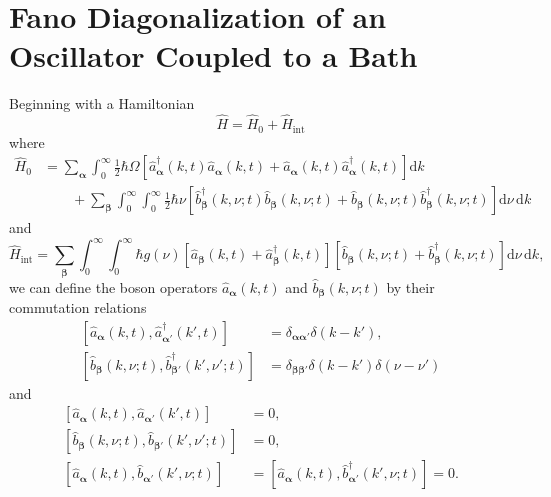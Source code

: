 
\section{Fano Diagonalization of an Oscillator Coupled to a Bath}\label{app:fanoDiagonalization}

Beginning with a Hamiltonian
\begin{equation}
\hat{H} = \hat{H}_0 + \hat{H}_\mathrm{int}
\end{equation}
where 
\begin{equation}
\begin{split}
\hat{H}_0 &= \sum_{\bm{\alpha}}\int_0^\infty\frac{1}{2}\hbar\Omega\left[\hat{a}_{\bm{\alpha}}^\dagger(k,t)\hat{a}_{\bm{\alpha}}(k,t) + \hat{a}_{\bm{\alpha}}(k,t)\hat{a}_{\bm{\alpha}}^\dagger(k,t)\right]\mathrm{d}k\\
&\qquad + \sum_{\bm{\beta}}\int_0^\infty\int_0^\infty\frac{1}{2}\hbar\nu\left[\hat{b}_{\bm{\beta}}^\dagger(k,\nu;t)\hat{b}_{\bm{\beta}}(k,\nu;t) + \hat{b}_{\bm{\beta}}(k,\nu;t)\hat{b}_{\bm{\beta}}^\dagger(k,\nu;t)\right]\mathrm{d}\nu\,\mathrm{d}k
\end{split}
\end{equation}
and
\begin{equation}
\hat{H}_\mathrm{int} = \sum_{\bm{\beta}}\int_0^\infty\int_0^\infty \hbar g(\nu)\left[\hat{a}_{\bm{\beta}}(k,t) + \hat{a}_{\bm{\beta}}^\dagger(k,t)\right]\left[\hat{b}_{\bm{\beta}}(k,\nu;t) + \hat{b}_{\bm{\beta}}^\dagger(k,\nu;t)\right]\mathrm{d}\nu\,\mathrm{d}k,
\end{equation}
we can define the boson operators $\hat{a}_{\bm{\alpha}}(k,t)$ and $\hat{b}_{\bm{\beta}}(k,\nu;t)$ by their commutation relations
\begin{equation}
\begin{split}
\left[\hat{a}_{\bm{\alpha}}(k,t),\hat{a}_{\bm{\alpha}'}^\dagger(k',t)\right] &= \delta_{\bm{\alpha}\bm{\alpha}'}\delta(k - k'),\\
\left[\hat{b}_{\bm{\beta}}(k,\nu;t),\hat{b}_{\bm{\beta}'}^\dagger(k',\nu';t)\right] &= \delta_{\bm{\beta}\bm{\beta}'}\delta(k - k')\delta(\nu - \nu')
\end{split}
\end{equation}
and
\begin{equation}
\begin{split}
\left[\hat{a}_{\bm{\alpha}}(k,t),\hat{a}_{\bm{\alpha}'}(k',t)\right] &= 0,\\
\left[\hat{b}_{\bm{\beta}}(k,\nu;t),\hat{b}_{\bm{\beta}'}(k',\nu';t)\right] &= 0,\\
\left[\hat{a}_{\bm{\alpha}}(k,t),\hat{b}_{\bm{\alpha}'}(k',\nu;t)\right] &= \left[\hat{a}_{\bm{\alpha}}(k,t),\hat{b}_{\bm{\alpha}'}^\dagger(k',\nu;t)\right] = 0.
\end{split}
\end{equation}
